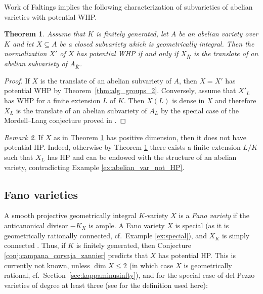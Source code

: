 \documentclass[10pt,a4paper]{amsart}
\theoremstyle{plain}
\newtheorem{theorem}{Theorem}
\theoremstyle{remark}
\newtheorem{remark}[theorem]{Remark}
\numberwithin{theorem}{section}
\begin{document}
 Work of Faltings \cite{Faltings2} 
  implies the following characterization of subvarieties of abelian varieties with potential WHP.

\begin{theorem}\label{thm:closed_subvarieties_of_ab_vars}
Assume that $K$ is finitely generated,
let $A$ be an abelian variety over $K$
and let $X\subseteq  A$ be a closed subvariety
which is geometrically integral. 
Then the normalization $X'$ of $X$ has potential WHP if and only if $X_{\overline{K}}$ is the translate of an abelian subvariety of $A_{\overline{K}}$.
\end{theorem}

\begin{proof}  
If $X$ is the translate of an abelian subvariety of $A$, then $X=X'$ has potential WHP by Theorem~\ref{thm:alg_groups_2}.
Conversely, assume that $X'_L$ has WHP for a finite extension $L$ of $K$. 
Then $X(L)$ is dense in $X$
and therefore $X_L$ is the translate of an abelian subvariety of $A_L$ by 
the special case of the Mordell--Lang conjecture proved in
\cite{Faltings2}.  
\end{proof} 
 
\begin{remark} 
If $X$ as in Theorem \ref{thm:closed_subvarieties_of_ab_vars} has positive dimension, then it does not have potential HP. 
Indeed, otherwise by
Theorem \ref{thm:closed_subvarieties_of_ab_vars}
there exists a finite extension $L/K$
such that $X_L$ has HP and can be endowed with the structure of an abelian variety, contradicting Example \ref{ex:abelian_var_not_HP}.  
\end{remark}
 
\subsection{Fano varieties}  
\label{sec:Fano}
A smooth projective geometrically integral $K$-variety $X$
is a {\em Fano variety} if 
the anticanonical divisor $-K_X$ is ample.
A Fano variety $X$ is special (as it is geometrically rationally connected, cf.~Example \ref{ex:special}), and $X_{\overline{K}}$ is  simply connected \cite[Corollary~4.29]{DebarreBook}.
Thus,   
if $K$ is finitely generated, then
Conjecture \ref{conj:campana_corvaja_zannier} predicts that $X$ has potential HP.
This is currently not known, unless $\dim X \leq 2$ (in which case $X$ is geometrically rational, cf.~Section~\ref{sec:kappaminusinfty}),
and for the special case
of del Pezzo varieties of degree at least three (see \cite[Definition 4.1]{Streeter} for the definition used here):
\end{document}
